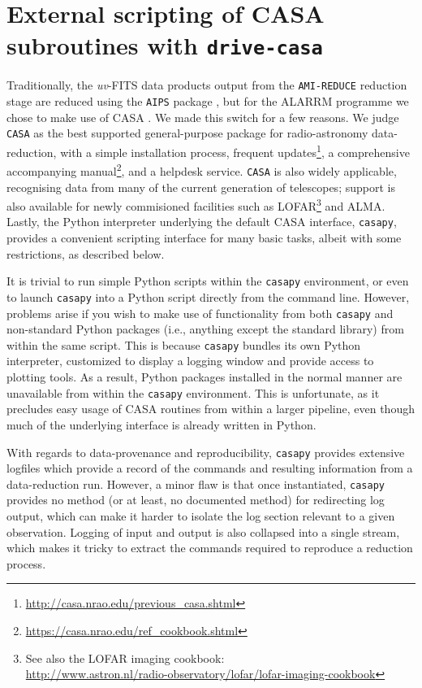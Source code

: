\documentclass[5p,authoryear]{elsarticle}
\begin{document}
\section{External scripting of CASA subroutines with \texttt{drive-casa}}
\label{sec:drive-casa}
Traditionally, the \textit{uv}-FITS data products output from the \texttt{AMI-REDUCE} reduction stage are reduced using the \texttt{AIPS} package \citep{Fomalont1981}, but for the ALARRM programme we chose to make use of CASA \citep{McMullin2007}. 
We made this switch for a few reasons. 
We judge \texttt{CASA} as the best supported general-purpose package for radio-astronomy data-reduction, 
with a simple installation process, 
frequent updates\footnote{\url{http://casa.nrao.edu/previous_casa.shtml}}, 
a comprehensive accompanying 
manual\footnote{\url{https://casa.nrao.edu/ref_cookbook.shtml}},
and a helpdesk service. 
\texttt{CASA} is also widely applicable, recognising data from many of the current generation of telescopes; support is also available for newly commisioned facilities such as 
LOFAR\footnote{%
See also the LOFAR imaging cookbook:\\ 
\url{http://www.astron.nl/radio-observatory/lofar/lofar-imaging-cookbook}
}
and ALMA. 
Lastly, the Python interpreter underlying the default CASA interface, \texttt{casapy}, provides a convenient scripting interface for many basic tasks, albeit with some restrictions, as described below.

It is trivial to run simple Python scripts within the \texttt{casapy} environment, or even to launch \texttt{casapy} into a Python script directly from the command line. 
However, problems arise if you wish to make use of functionality from both \texttt{casapy} and non-standard Python packages (i.e., anything except the standard library) from within the same script.
This is because \texttt{casapy} bundles its own Python interpreter, customized to display a logging window and provide access to plotting tools. 
As a result, Python packages installed in the normal manner are unavailable from within the \texttt{casapy} environment. 
This is unfortunate, as it precludes easy usage of CASA routines from within a larger pipeline, even though much of the underlying interface is already written in Python.

With regards to data-provenance and reproducibility, \texttt{casapy} provides extensive logfiles which provide a record of the commands and resulting information from a data-reduction run. 
However, a minor flaw is that once instantiated, \texttt{casapy} provides no method (or at least, no documented method) for redirecting log output, which can make it harder to isolate the log section relevant to a given observation. 
Logging of input and output is also collapsed into a single stream, which makes it tricky to extract the commands required to reproduce a reduction process.
\end{document}
